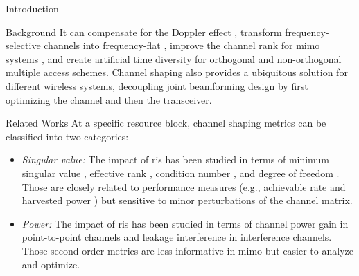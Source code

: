 \documentclass[journal]{IEEEtran}
\begin{document}
\begin{section}{Introduction}
\begin{subsection}{Background}
		It can compensate for the Doppler effect \cite{Basar2021}, transform frequency-selective channels into frequency-flat \cite{Arslan2022}, improve the channel rank for \gls{mimo} systems \cite{Ozdogan2020a}, and create artificial time diversity for orthogonal \cite{Yang2019} and non-orthogonal \cite{Chen2023} multiple access schemes.
		Channel shaping also provides a ubiquitous solution for different wireless systems, decoupling joint beamforming design by first optimizing the channel and then the transceiver.
	\end{subsection}

	\begin{subsection}{Related Works}
		At a specific resource block, channel shaping metrics can be classified into two categories:
		\begin{itemize}
			\item \emph{Singular value:} The impact of \gls{ris} has been studied in terms of minimum singular value \cite{ElMossallamy2021}, effective rank \cite{ElMossallamy2021,Meng2023}, condition number \cite{Zheng2022,Huang2023}, and degree of freedom \cite{Bafghi2022,Zheng2023,Chae2023}. Those are closely related to performance measures (e.g., achievable rate and harvested power \cite{Shen2021}) but sensitive to minor perturbations of the channel matrix.
			\item \emph{Power:} The impact of \gls{ris} has been studied in terms of channel power gain \cite{Wu2019,Shen2020a,Nerini2023,Nerini2024,Santamaria2023} in point-to-point channels and leakage interference \cite{Santamaria2023a} in interference channels. Those second-order metrics are less informative in \gls{mimo} but easier to analyze and optimize.
		\end{itemize}


\end{subsection}
\end{section}
\end{document}
